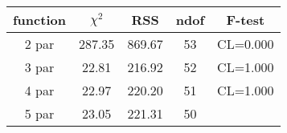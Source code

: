 \begin{tabular}{c|c|c|c|c}
function & $\chi^2$ & RSS & ndof & F-test \\
\hline
2 par & 287.35 & 869.67 & 53 & CL=0.000 \\
3 par & 22.81 & 216.92 & 52 & CL=1.000 \\
4 par & 22.97 & 220.20 & 51 & CL=1.000 \\
5 par & 23.05 & 221.31 & 50 & \\
\hline
\end{tabular}